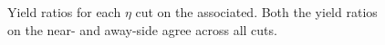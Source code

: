 \documentclass[../main.tex]{subfiles}
\begin{document}

\begin{figure}[h]%
   \centering
   \caption{Yield ratios for each $\eta$ cut on the associated. Both the yield ratios on the near- and away-side agree across all cuts.}%
   \label{fig:yield_ratios}%
\end{figure}
\end{document}
